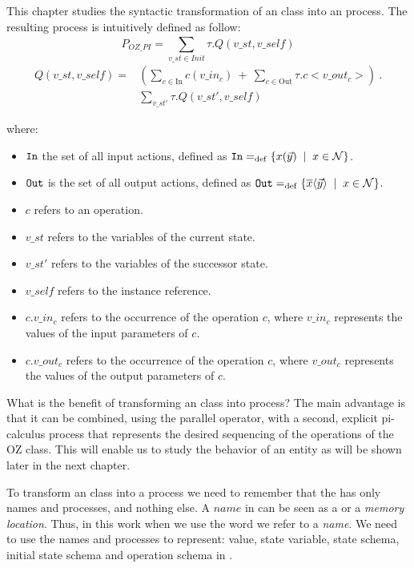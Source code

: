 This chapter studies the syntactic transformation of an \oz{} class into an \picalc{} process. The resulting process is intuitively defined as follow:\\
\[P_{OZ\_PI} = \sum_{v\_st\in Init}^{} \tau. Q(v\_st,v\_self)\]
\begin{equation*}
\begin{aligned}
Q(v\_st,v\_self) ={} & (\sum_{c\in \text{In}}^{} c(v\_in_{c}) \ +\ \sum_{c\in \text{Out}}^{} \tau.c<v\_out_{c}>)\ . \\
      &  \sum_{v\_st'}^{} \tau.Q(v\_st',v\_self)
\end{aligned}
\end{equation*}

where:
\begin{itemize}
\item $\mathtt{In}$ the set of all input actions, defined as $\inA\define\set[x\in\names]{\inp{x}{\vec{y}}}$.
\item $\mathtt{Out}$ is the set of all output actions, defined as $\outA\define\set[x\in\names]{\out{x}{\vec{y}}}$.
\item $c$ refers to an operation.
\item $v\_st$ refers to the variables of the current state.
\item $v\_st'$ refers to the variables of the successor state.
\item $v\_self$ refers to the instance reference.
\item $c.v\_in_{c}$ refers to the occurrence of the operation $c$, where $v\_in_{c}$ represents the values of the input parameters of $c$.
\item $c.v\_out_{c}$ refers to the occurrence of the operation $c$, where $v\_out_{c}$ represents the values of the output parameters of $c$.
\end{itemize}

What is the benefit of transforming an \oz{} class into \picalc{} process? The main advantage is that it can be combined, using the
parallel operator, with a second, explicit pi-calculus
process that represents the desired sequencing of the operations
of the OZ class. This will enable us to study the behavior of an entity as will be shown later in the next chapter.

To transform an \oz{} class into a \picalc{} process we need to remember that the \picalc{} has only names and processes, and nothing else. A $name$ in \picalc{} can be seen as a  or a \textit{memory location}. Thus, in this work when we use the word  we refer to a \picalc{} \textit{name}. We need to use the names and processes to represent: value, state variable, state schema, initial state schema and operation schema in \picalc{}.
